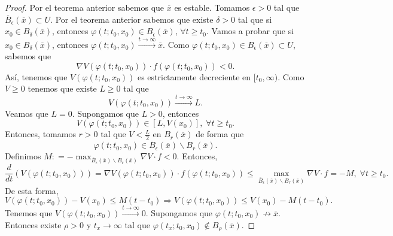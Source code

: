 \begin{proof}
Por el teorema anterior sabemos que $\displaystyle \overline{x} $ es estable. Tomamos $\displaystyle \epsilon > 0 $ tal que $\displaystyle \overline{B}_{\epsilon }\left(\overline{x}\right)\subset U $. Por el teorema anterior sabemos que existe $\displaystyle \delta > 0 $ tal que si $\displaystyle x_{0}\in B_{\delta }\left(\overline{x}\right) $, entonces $\displaystyle \varphi\left(t; t_{0}, x_{0}\right)\in B_{\epsilon }\left(\overline{x}\right) $, $\displaystyle \forall t \geq t_{0} $.
Vamos a probar que si $\displaystyle x_{0}\in B_{\delta }\left(\overline{x}\right) $, entonces $\displaystyle \varphi\left(t; t_{0}, x_{0}\right) \xrightarrow{t \to \infty}\overline{x} $. Como $\displaystyle \varphi\left(t; t_{0}, x_{0}\right)\in B_{\epsilon }\left(\overline{x}\right)\subset U $, sabemos que 
\[\nabla V\left(\varphi\left(t; t_{0}, x_{0}\right)\right) \cdot f\left(\varphi\left(t; t_{0}, x_{0}\right)\right) < 0 .\]
Así, tenemos que $\displaystyle V\left(\varphi\left(t; t_{0}, x_{0}\right)\right) $ es estrictamente decreciente en $\displaystyle [t_{0}, \infty) $. 
Como $\displaystyle V \geq 0 $ tenemos que existe $\displaystyle L \geq 0 $ tal que 
\[V\left(\varphi\left(t; t_{0}, x_{0}\right)\right)\xrightarrow{t \to \infty }L .\]
Veamos que $\displaystyle L = 0 $. Supongamos que $\displaystyle L > 0 $, entonces
\[V\left(\varphi\left(t; t_{0}, x_{0}\right)\right)\in [L, V\left(x_{0}\right)], \; \forall t \geq t_{0} .\]
Entonces, tomamos $\displaystyle r > 0 $ tal que $\displaystyle V < \frac{L}{2} $ en $\displaystyle B_{r}\left(\overline{x}\right) $ de forma que
\[\varphi\left(t; t_{0}, x_{0}\right)\in \overline{B}_{\epsilon }\left(\overline{x}\right) \backslash B_{r}\left(\overline{x}\right) .\]
Definimos $\displaystyle M : = - \max_{\overline{B}_{\epsilon }\left(\overline{x}\right) \backslash B_{r}\left(\overline{x}\right)} \nabla V \cdot f <0 $. Entonces, 
\[\frac{d}{dt}\left(V\left(\varphi\left(t; t_{0}, x_{0}\right)\right)\right) = \nabla V\left(\varphi\left(t; t_{0}, x_{0}\right)\right) \cdot f\left(\varphi\left(t; t_{0}, x_{0}\right)\right) \leq \max_{\overline{B}_{\epsilon }\left(\overline{x}\right) \backslash B_{r}\left(\overline{x}\right)}\nabla V \cdot f = - M, \; \forall t \geq t_{0}.\]
De esta forma, 
\[V\left(\varphi\left(t; t_{0}, x_{0}\right)\right)-V\left(x_{0}\right) \leq M\left(t-t_{0}\right) \Rightarrow V\left(\varphi\left(t; t_{0}, x_{0}\right)\right) \leq V\left(x_{0}\right)-M\left(t-t_{0}\right) .\]
Tenemos que $\displaystyle V\left(\varphi\left(t; t_{0}, x_{0}\right)\right)\xrightarrow{t \to \infty} 0 $. Supongamos que $\displaystyle \varphi\left(t; t_{0}, x_{0}\right)\not \to \overline{x} $. Entonces existe $\displaystyle \rho > 0 $ y $\displaystyle t_{x} \to \infty $ tal que $\displaystyle \varphi\left(t_{x}; t_{0}, x_{0}\right)\not\in B_{\rho }\left(\overline{x}\right) $. 

\end{proof}
